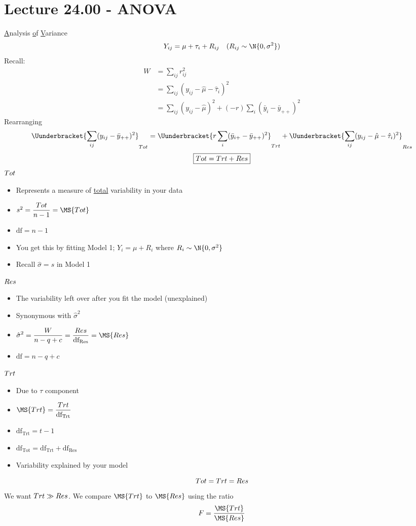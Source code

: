 \section{Lecture 24.00 - ANOVA}
\underline{A}nalysis \underline{o}f \underline{V}ariance
\[ Y_{ij}=\mu+\tau_i+R_{ij}\quad(R_{ij}\sim \N{0,\sigma^2}) \]
Recall:
\begin{align*}
    W
     & =\sum_{ij}r_{ij}^2                                                      \\
     & =\sum_{ij}(y_{ij}-\hat{\mu}-\hat{\tau}_i)^2                             \\
     & =\sum_{ij}(y_{ij}-\hat{\mu})^2+(-r)\sum_{i}(\bar{y}_{i}-\bar{y}_{++})^2
\end{align*}
Rearranging
\[ \Uunderbracket{\sum_{ij}(y_{ij}-\bar{y}_{++})^2}_{\SS{Tot}}
    =\Uunderbracket{r \sum_{i}(\bar{y}_{i+}-\bar{y}_{++})^2}_{\SS{Trt}}+
    \Uunderbracket{\sum_{ij}(y_{ij}-\hat{\mu}-\hat{\tau}_i)^2}_{\SS{Res}}   \]
\[ \boxed{\relax{Tot}=\relax{Trt}+\relax{Res}} \]
$ \relax{Tot} $
\begin{itemize}
    \item Represents a measure of \underline{total}
          variability in your data
    \item $ s^2=\dfrac{\SS{Tot}}{n-1}=\MS{Tot} $
    \item $ \text{df}=n-1 $
    \item You get this by fitting Model 1; $ Y_{i}=\mu+R_{i} $
          where $ R_i \sim \N{0,\sigma^2} $
    \item Recall $ \hat{\sigma}=s $ in Model 1
\end{itemize}
$ \relax{Res} $
\begin{itemize}
    \item The variability left over after you fit the model (unexplained)
    \item Synonymous with $ \hat{\sigma}^2 $
    \item $ \displaystyle \hat{\sigma}^2=\frac{W}{n-q+c} =\frac{\SS{Res}}{\text{df}_{\text{Res}}}=\MS{Res} $
    \item $ \text{df}=n-q+c $
\end{itemize}
$ \relax{Trt} $
\begin{itemize}
    \item Due to $ \tau $ component
    \item $ \MS{Trt}=\dfrac{\SS{Trt}}{\text{df}_{\text{Trt}}} $
    \item $ \text{df}_{\text{Trt}}=t-1 $
    \item $ \boxed{\text{df}_{\text{Tot}}=\text{df}_{\text{Trt}}+\text{df}_{\text{Res}}} $
    \item Variability explained by your model
\end{itemize}
\[ \relax{Tot}=\relax{Trt}=\relax{Res} \]
We want $ \relax{Trt}\gg \relax{Res} $. We compare
$ \MS{Trt} $ to $ \MS{Res} $ using the ratio
\[ F=\frac{\MS{Trt}}{\MS{Res}} \]

